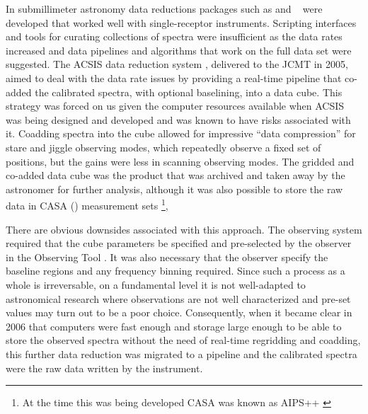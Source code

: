 \documentclass[final,authoryear,5p,times,twocolumn]{elsarticle}
\begin{document}
In submillimeter astronomy data reductions packages such as
\citep[][]{2005sf2a.conf..721P} and
\specx\ \citep[][]{SPECX} were developed that worked well with
single-receptor instruments. Scripting interfaces and tools for
curating collections of spectra were insufficient as the data rates
increased and data pipelines \citep[e.g.,][]{1995ASPC...75..117W} and
algorithms that work on the full data set
\citep[e.g.,][]{2002ASPC..278..329M} were suggested. The ACSIS data
reduction system \citep{2000ASPC..216..502L,2000SPIE.4015..114H},
delivered to the JCMT in 2005, aimed to deal with the data rate issues
by providing a real-time pipeline that co-added the calibrated
spectra, with optional baselining, into a data cube.  This strategy
was forced on us given the computer resources available when ACSIS was
being designed and developed and was known to have risks associated
with it. Coadding spectra into the cube allowed for impressive ``data
compression'' for stare and jiggle observing modes, which repeatedly
observe a fixed set of positions, but the gains were less in scanning
observing modes.
The gridded and co-added data cube was the product that was archived
and taken away  by the astronomer for further analysis, although it was
also possible to store the raw data in CASA () measurement sets
\citep{2012ASPC..461..849P}\footnote{At the time this was being
  developed CASA was known as AIPS++ \citep{2004ASPC..314..468M}},

There are obvious downsides associated with this approach. The
observing system required that the cube parameters be specified and
pre-selected by the observer in the Observing Tool
\citep{2002ASPC..281..453F}. It was also
necessary that the observer specify the baseline regions and any
frequency binning required. Since such a process as a whole is
irreversable, on a fundamental level it is not well-adapted to
astronomical research where observations are not well characterized
and pre-set values may turn out to be a poor choice.  Consequently,
when it became clear in 2006 that computers were fast enough and storage
large enough to be able to store the observed spectra without the need
of real-time regridding and coadding, this further data reduction was
migrated to a pipeline and the calibrated spectra were the raw data
written by the instrument.
\end{document}
